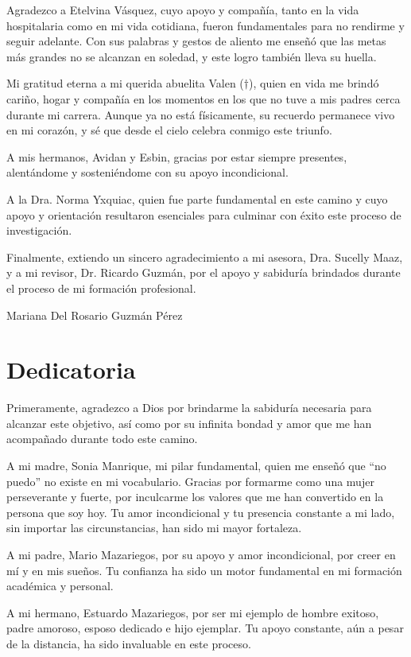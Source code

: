 \documentclass[11pt,letterpaper]{report}
\begin{document}
Agradezco a Etelvina Vásquez, cuyo apoyo y compañía, tanto en la vida 
hospitalaria como en mi vida cotidiana, fueron fundamentales para no rendirme 
y seguir adelante. Con sus palabras y gestos de aliento me enseñó que las 
metas más grandes no se alcanzan en soledad, y este logro también lleva su 
huella.

Mi gratitud eterna a mi querida abuelita Valen ($\dagger$), quien en vida me 
brindó cariño, hogar y compañía en los momentos en los que no tuve a mis padres 
cerca durante mi carrera. Aunque ya no está físicamente, su recuerdo permanece 
vivo en mi corazón, y sé que desde el cielo celebra conmigo este triunfo.

A mis hermanos, Avidan y Esbin, gracias por estar siempre presentes, 
alentándome y sosteniéndome con su apoyo incondicional.

A la Dra. Norma Yxquiac, quien fue parte fundamental en este camino y cuyo 
apoyo y orientación resultaron esenciales para culminar con éxito este proceso 
de investigación.

Finalmente, extiendo un sincero agradecimiento a mi asesora, Dra. Sucelly Maaz, 
y a mi revisor, Dr. Ricardo Guzmán, por el apoyo y sabiduría brindados durante 
el proceso de mi formación profesional.

\begin{flushright}
Mariana Del Rosario Guzmán Pérez
\end{flushright}

\chapter*{Dedicatoria}
Primeramente, agradezco a Dios por brindarme la sabiduría necesaria para
alcanzar este objetivo, así como por su infinita bondad y amor que me han
acompañado durante todo este camino.

A mi madre, Sonia Manrique, mi pilar fundamental, quien me enseñó que ``no
puedo'' no existe en mi vocabulario. Gracias por formarme como una mujer
perseverante y fuerte, por inculcarme los valores que me han convertido en la 
persona que soy hoy. Tu amor incondicional y tu presencia constante a mi lado, 
sin importar las circunstancias, han sido mi mayor fortaleza.

A mi padre, Mario Mazariegos, por su apoyo y amor incondicional, por creer en 
mí y en mis sueños. Tu confianza ha sido un motor fundamental en mi formación 
académica y personal.

A mi hermano, Estuardo Mazariegos, por ser mi ejemplo de hombre exitoso, padre 
amoroso, esposo dedicado e hijo ejemplar. Tu apoyo constante, aún a pesar de 
la distancia, ha sido invaluable en este proceso.
\end{document}
